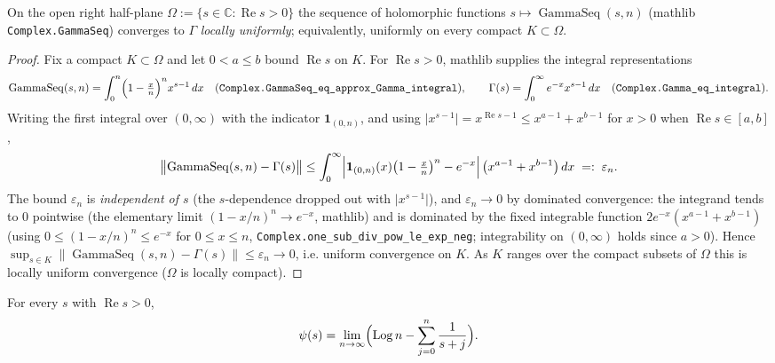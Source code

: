 \begin{lemma}
\label{lem:gs_gammaSeq_locunif}
\leanok
On the open right half-plane $\Omega:=\{s\in\mathbb{C}:\operatorname{Re}s>0\}$ the
sequence of holomorphic functions $s\mapsto\operatorname{GammaSeq}(s,n)$ (mathlib
\texttt{Complex.GammaSeq}) converges to $\Gamma$ \emph{locally uniformly}; equivalently,
uniformly on every compact $K\subset\Omega$.
\end{lemma}

\begin{proof}
\leanok
Fix a compact $K\subset\Omega$ and let $0<a\le b$ bound $\operatorname{Re}s$ on $K$.
For $\operatorname{Re}s>0$, mathlib supplies the integral representations
\[
  \operatorname{GammaSeq}(s,n)=\int_{0}^{n}\Bigl(1-\tfrac{x}{n}\Bigr)^{n}x^{s-1}\,dx
  \quad(\texttt{Complex.GammaSeq\_eq\_approx\_Gamma\_integral}),
  \qquad
  \Gamma(s)=\int_{0}^{\infty}e^{-x}x^{s-1}\,dx
  \quad(\texttt{Complex.Gamma\_eq\_integral}).
\]
Writing the first integral over $(0,\infty)$ with the indicator $\mathbf 1_{(0,n)}$,
and using $\lvert x^{s-1}\rvert=x^{\operatorname{Re}s-1}\le x^{a-1}+x^{b-1}$ for $x>0$
when $\operatorname{Re}s\in[a,b]$,
\[
  \bigl\|\operatorname{GammaSeq}(s,n)-\Gamma(s)\bigr\|
  \le\int_{0}^{\infty}
     \Bigl|\mathbf 1_{(0,n)}(x)\bigl(1-\tfrac xn\bigr)^{n}-e^{-x}\Bigr|\,
     \bigl(x^{a-1}+x^{b-1}\bigr)\,dx \;=:\;\varepsilon_n .
\]
The bound $\varepsilon_n$ is \emph{independent of $s$} (the $s$-dependence dropped out
with $\lvert x^{s-1}\rvert$), and $\varepsilon_n\to0$ by dominated convergence: the
integrand tends to $0$ pointwise (the elementary limit $(1-x/n)^{n}\to e^{-x}$,
mathlib) and is dominated by the fixed integrable function
$2e^{-x}(x^{a-1}+x^{b-1})$ (using $0\le(1-x/n)^{n}\le e^{-x}$ for $0\le x\le n$,
\texttt{Complex.one\_sub\_div\_pow\_le\_exp\_neg}; integrability on $(0,\infty)$ holds
since $a>0$). Hence $\sup_{s\in K}\|\operatorname{GammaSeq}(s,n)-\Gamma(s)\|\le
\varepsilon_n\to0$, i.e. uniform convergence on $K$. As $K$ ranges over the compact
subsets of $\Omega$ this is locally uniform convergence ($\Omega$ is locally compact).
\end{proof}

\begin{lemma}
\label{lem:gs_gauss}
\leanok
{}
For every $s$ with $\operatorname{Re}s>0$,
\[
  \psi(s)=\lim_{n\to\infty}\Bigl(\operatorname{Log}n-\sum_{j=0}^{n}\frac1{s+j}\Bigr).
\]
\end{lemma}

